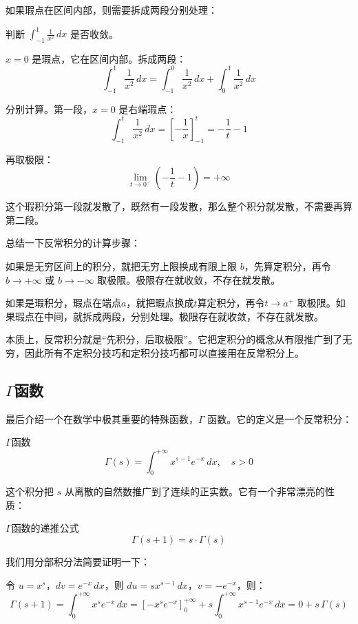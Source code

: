 如果瑕点在区间内部，则需要拆成两段分别处理：

\begin{myexample}
  判断 $\int_{-1}^1 \frac{1}{x^2}\, dx$ 是否收敛。

  $x = 0$ 是瑕点，它在区间内部。拆成两段：
  \[
  \int_{-1}^1 \frac{1}{x^2}\, dx = \int_{-1}^0 \frac{1}{x^2}\, dx + \int_0^1 \frac{1}{x^2}\, dx
  \]

  分别计算。第一段，$x = 0$ 是右端瑕点：
  \[
  \int_{-1}^t \frac{1}{x^2}\, dx = [-\frac{1}{x}]_{-1}^t = -\frac{1}{t} - 1
  \]

  再取极限：
  \[\lim_{t \to 0^-} (-\frac{1}{t} - 1) = +\infty\]
  
  这个瑕积分第一段就发散了，既然有一段发散，那么整个积分就发散，不需要再算第二段。
\end{myexample}

总结一下反常积分的计算步骤：

如果是无穷区间上的积分，就把无穷上限换成有限上限 $b$，先算定积分，再令 $b \to +\infty$ 或 $b \to -\infty$ 取极限。极限存在就收敛，不存在就发散。

如果是瑕积分，瑕点在端点$a$，就把瑕点换成$t$算定积分，再令$t \to a^+$ 取极限。如果瑕点在中间，就拆成两段，分别处理。极限存在就收敛，不存在就发散。

本质上，反常积分就是“先积分，后取极限”。它把定积分的概念从有限推广到了无穷，因此所有不定积分技巧和定积分技巧都可以直接用在反常积分上。

\subsection{$\Gamma$函数}

最后介绍一个在数学中极其重要的特殊函数，$\Gamma$ 函数。它的定义是一个反常积分：

\begin{definition}{$\Gamma$函数}{}
\[
\Gamma(s) = \int_0^{+\infty} x^{s-1} e^{-x}\, dx, \quad s > 0
\]
\end{definition}

这个积分把 $s$ 从离散的自然数推广到了连续的正实数。它有一个非常漂亮的性质：

\begin{theorem}{$\Gamma$函数的递推公式}{}
\[
\Gamma(s+1) = s \cdot \Gamma(s)
\]
\end{theorem}

我们用分部积分法简要证明一下：

令 $u = x^s$，$dv = e^{-x}\,dx$，则 $du = sx^{s-1}\,dx$，$v = -e^{-x}$，则：
\[
\Gamma(s+1) = \int_0^{+\infty} x^s e^{-x}\, dx = [-x^s e^{-x}]_0^{+\infty} + s\int_0^{+\infty} x^{s-1} e^{-x}\, dx = 0 + s\,\Gamma(s)
\]

